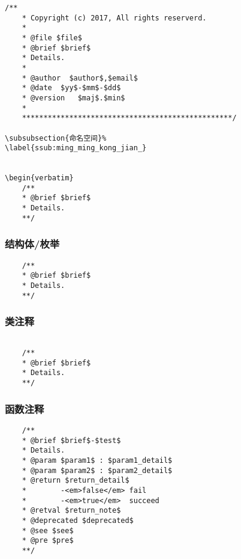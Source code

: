 \documentclass[a4paper]{ctexart}
\begin{document}
\begin{verbatim}
/**
    * Copyright (c) 2017, All rights reserverd.
    * 
    * @file $file$
    * @brief $brief$
    * Details.
    * 
    * @author  $author$,$email$
    * @date  $yy$-$mm$-$dd$
    * @version   $maj$.$min$
    *
    *************************************************/

\subsubsection{命名空间}%
\label{ssub:ming_ming_kong_jian_}


\begin{verbatim}
    /**
    * @brief $brief$
    * Details.
    **/

\end{verbatim}
   

\subsubsection{结构体/枚举}%
\label{ssub:jie_gou_ti_mei_ju_}


\begin{verbatim}
    /** 
    * @brief $brief$
    * Details.
    **/

\end{verbatim}
   
\subsubsection{类注释}%
\label{ssub:lei_zhu_shi_}
\begin{verbatim}

    /**
    * @brief $brief$
    * Details.
    **/

\end{verbatim}
   
\subsubsection{函数注释}%
\label{ssub:han_shu_zhu_shi_}


   \begin{verbatim}
    /** 
    * @brief $brief$-$test$
    * Details.
    * @param $param1$ : $param1_detail$
    * @param $param2$ : $param2_detail$
    * @return $return_detail$
    *        -<em>false</em> fail
    *        -<em>true</em>  succeed
    * @retval $return_note$
    * @deprecated $deprecated$
    * @see $see$
    * @pre $pre$
    **/

   \end{verbatim}
      
\end{document}
